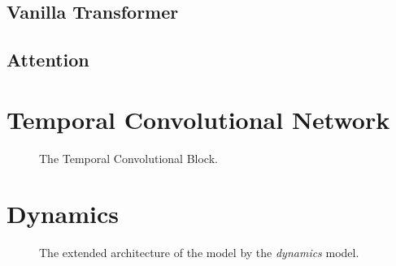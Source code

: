 \subsection{Vanilla Transformer}

\missing



\subsection{Attention}

\missing



\section{Temporal Convolutional Network}

\missing

\begin{figure}[ht!]
\centering

\caption[The Temporal Convolutional Block.]{The Temporal Convolutional Block.}
\end{figure}

\section{Dynamics}

\missing

\begin{figure}[!ht]
\centering

\caption[The extended architecture of the model.]{The extended architecture of the model by the \emph{dynamics} model.}
\end{figure}